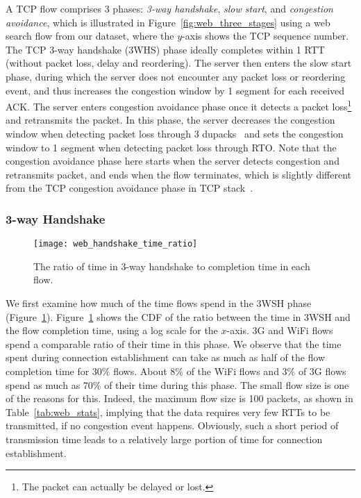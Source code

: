 A TCP flow comprises 3 phases: \emph{3-way handshake}, \emph{slow start}, and \emph{congestion avoidance}, which is illustrated in Figure~\ref{fig:web_three_stages} using a web search flow from our dataset, where the $y$-axis shows the TCP sequence number. The TCP 3-way handshake (3WHS) phase ideally completes within 1 RTT (\ie without packet loss, delay and reordering). The server then enters the slow start phase, during which the server does not encounter any packet loss or reordering event, and thus increases the congestion window by 1 segment for each received ACK. The server enters congestion avoidance phase once it detects a packet loss\footnote{The packet can actually be delayed or lost.} and retransmits the packet. In this phase, the server decreases the congestion window when detecting packet loss through 3 dupacks~\cite{rfc6675} and sets the congestion window to 1 segment when detecting packet loss through RTO. Note that the congestion avoidance phase here starts when the server detects congestion and retransmits packet, and ends when the flow terminates, which is slightly different from the TCP congestion avoidance phase in TCP stack~\cite{jacobson1988congestion}.

\subsubsection{3-way Handshake}

\begin{figure}[th]
\centering
\texttt{[image: web\_handshake\_time\_ratio]}
\caption{The ratio of time in 3-way handshake to completion time in each flow.}
\label{fig:web_handshake_ratio}
\minsqueeze
\end{figure}

We first examine how much of the time flows spend in the 3WSH phase (Figure~\ref{fig:web_handshake_ratio}). Figure~\ref{fig:web_handshake_ratio} shows the CDF of the ratio between the time in 3WSH and the flow completion time, using a log scale for the $x$-axis. 3G and WiFi flows spend a comparable ratio of their time in this phase. We observe that the time spent during connection establishment can take as much as half of the flow completion time for 30\% flows. About 8\% of the WiFi flows and 3\% of 3G flows spend as much as 70\% of their time during this phase. The small flow size is one of the reasons for this. Indeed, the maximum flow size is 100 packets, as shown in Table~\ref{tab:web_stats}, implying that the data requires very few RTTs to be transmitted, if no congestion event happens. Obviously, such a short period of transmission time leads to a relatively large portion of time for connection establishment.

